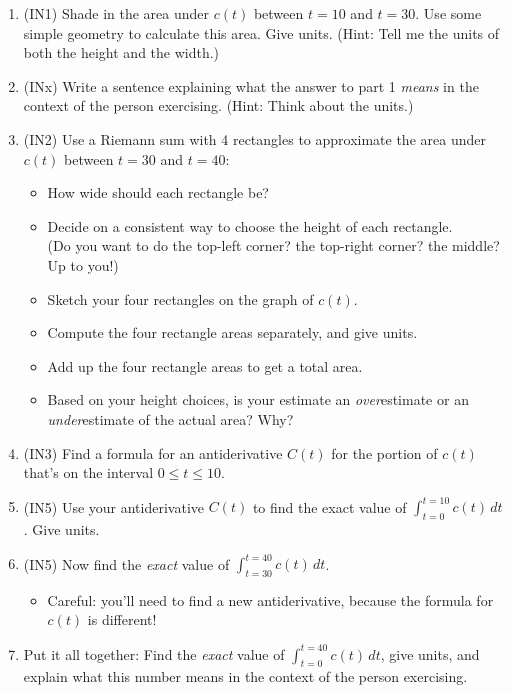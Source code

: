 \begin{enumerate}[leftmargin=0.5cm]
    \item (IN1) Shade in the area under \(c(t)\) between \(t = 10\) and \(t = 30\). Use some simple geometry to calculate this area. Give units. (Hint: Tell me the units of both the height and the width.)
    \item 
    (INx) Write a sentence explaining what the answer to part 1 \textit{means} in the context of the person exercising. (Hint: Think about the units.)
    \item
    (IN2) Use a Riemann sum with 4 rectangles to approximate the area under \(c(t)\) between \(t = 30\) and \(t=40\):
    \begin{itemize}
        \item 
        How wide should each rectangle be?
        \item 
        Decide on a consistent way to choose the height of each rectangle. \\
        (Do you want to do the top-left corner? the top-right corner? the middle? Up to you!)
        \item 
        Sketch your four rectangles on the graph of \(c(t)\).
        \item 
        Compute the four rectangle areas separately, and give units.
        \item 
        Add up the four rectangle areas to get a total area.
        \item 
        Based on your height choices, is your estimate an \textit{over}estimate or an \textit{under}estimate of the actual area? Why?
    \end{itemize}
    \item (IN3) Find a formula for an antiderivative \(C(t)\) for the portion of \(c(t)\) that's on the interval \(0\leq t\leq 10\).
    \item (IN5) Use your antiderivative \(C(t)\) to find the exact value of \(\displaystyle \int_{t=0}^{t=10} c(t)\, dt\). Give units.
    \item (IN5) Now find the \textit{exact} value of \(\displaystyle \int_{t=30}^{t=40} c(t)\, dt\).
    \begin{itemize}
        \item Careful: you'll need to find a new antiderivative, because the formula for \(c(t)\) is different!
    \end{itemize}
    \item Put it all together: Find the \textit{exact} value of \(\displaystyle \int_{t=0}^{t=40} c(t)\, dt\), give units, and explain what this number means in the context of the person exercising.
\end{enumerate}

